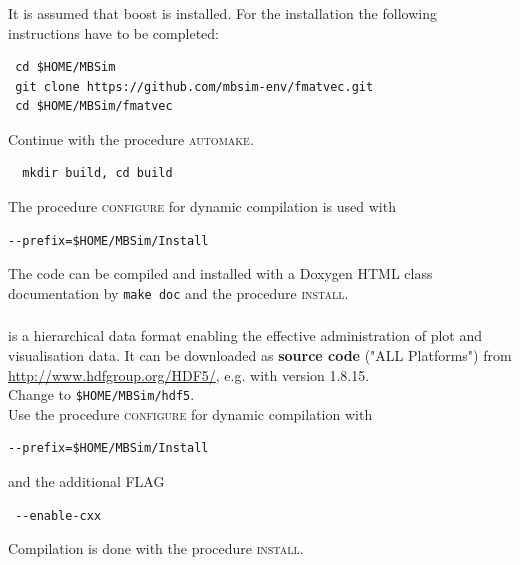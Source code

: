 \subsubsection{\FMatVec{}}
It is assumed that boost is installed. For the installation the following instructions have to be completed:
\begin{verbatim}
 cd $HOME/MBSim
 git clone https://github.com/mbsim-env/fmatvec.git
 cd $HOME/MBSim/fmatvec
\end{verbatim}
Continue with the procedure \textsc{automake}.
\begin{verbatim}
  mkdir build, cd build
\end{verbatim}
The procedure \textsc{configure} for dynamic compilation is used with
\begin{verbatim}
--prefix=$HOME/MBSim/Install
\end{verbatim}
The code can be compiled and installed with a Doxygen HTML class documentation by \texttt{make doc} and the procedure \textsc{install}.

\subsubsection{\HDFSerie}
%
\paragraph{\HDF}
\HDF{} is a hierarchical data format enabling the effective administration of plot and visualisation data. It can be downloaded as \textbf{source code} ("ALL Platforms") from \url{http://www.hdfgroup.org/HDF5/}, e.g. with version 1.8.15.\\
%
Change to \texttt{\$HOME/MBSim/hdf5}.\\
%
Use the procedure \textsc{configure} for dynamic compilation with
\begin{verbatim}
--prefix=$HOME/MBSim/Install
\end{verbatim}
and the additional FLAG
\begin{verbatim}
 --enable-cxx
\end{verbatim}
Compilation is done with the procedure \textsc{install}.
%
